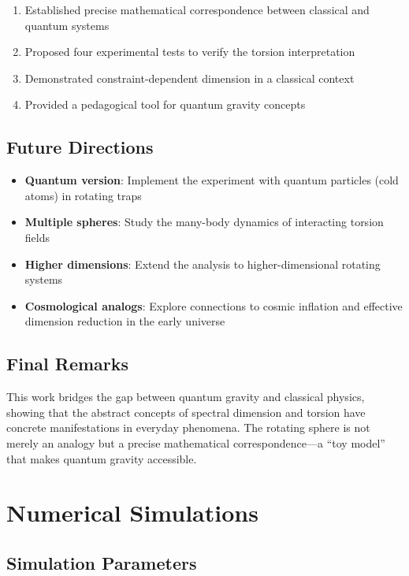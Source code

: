 \documentclass[12pt,a4paper]{article}
\begin{document}
\begin{enumerate}
    \item Established precise mathematical correspondence between classical and quantum systems
    \item Proposed four experimental tests to verify the torsion interpretation
    \item Demonstrated constraint-dependent dimension in a classical context
    \item Provided a pedagogical tool for quantum gravity concepts
\end{enumerate}

\subsection{Future Directions}

\begin{itemize}
    \item \textbf{Quantum version}: Implement the experiment with quantum particles (cold atoms) in rotating traps
    \item \textbf{Multiple spheres}: Study the many-body dynamics of interacting torsion fields
    \item \textbf{Higher dimensions}: Extend the analysis to higher-dimensional rotating systems
    \item \textbf{Cosmological analogs}: Explore connections to cosmic inflation and effective dimension reduction in the early universe
\end{itemize}

\subsection{Final Remarks}

This work bridges the gap between quantum gravity and classical physics, showing that the abstract concepts of spectral dimension and torsion have concrete manifestations in everyday phenomena. The rotating sphere is not merely an analogy but a precise mathematical correspondence---a ``toy model'' that makes quantum gravity accessible.

\appendix

\section{Numerical Simulations}
\label{app:numerical}

\subsection{Simulation Parameters}
\end{document}
